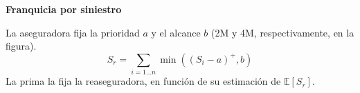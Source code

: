 \begin{f}
\textbf{Franquicia por siniestro}
	
La aseguradora fija la prioridad \(a\) y el alcance \(b\) (2M\EUR{} y 4M\EUR{}, respectivamente, en la figura).
\[
S_r= \sum_{i=1\ldots n} \min\left( \left( S_i-a\right)^+,b\right)  
\]
La prima la fija la reaseguradora, en función de su estimación de \(\mathbb{E}[S_r]\).


\end{f}
